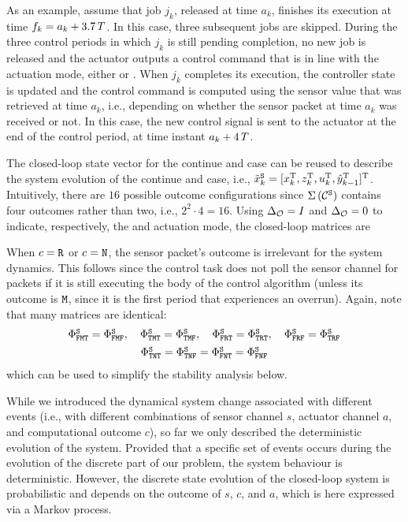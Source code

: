As an example, assume that job $j_k$, released at time $a_k$, finishes its execution at time $f_k = a_k + 3.7\,T$.
In this case, three subsequent jobs are skipped.
During the three control periods in which $j_k$ is still pending completion, no new job is released and the actuator outputs a control command that is in line with the actuation mode, either \tH{} or \tZ{}.
When $j_k$ completes its execution, the controller state is updated and the control command is computed using the sensor value that was retrieved at time $a_k$, i.e., depending on whether the sensor packet at time $a_k$ was received or not.
In this case, the new control signal is sent to the actuator at the end of the control period, at time instant $a_k+4\,T$.

The closed-loop state vector for the continue and \tK{} case can be reused to describe the system evolution of the continue and \tS{} case, i.e., $\tilde x_k^{\texttt{S}} = [ x_k^{\mathrm{\small{T}}}{}, z_k^{\mathrm{\small{T}}}{}, u_k^{\mathrm{\small{T}}}{}, \hat y_{k-1}^{\mathrm{\small{T}}}{} ]^{\mathrm{\small{T}}}{}$.
Intuitively, there are $16$ possible outcome configurations since $\Sigma\,({\mathcal{C}^{\texttt{S}}}){}$ contains four outcomes rather than two, i.e., $2^2\cdot 4=16$.
Using $\Delta_{\mathcal{O}} = I$ and $\Delta_{\mathcal{O}} = 0$ to indicate, respectively, the \tH{} and \tZ{} actuation mode, the closed-loop matrices are
{\small
%
}

When $c=\texttt{R}$ or $c=\texttt{N}$, the sensor packet's outcome is irrelevant for the system dynamics.
This follows since the control task does not poll the sensor channel for packets if it is still executing the body of the control algorithm (unless its outcome is $\texttt{M}$, since it is the first period that experiences an overrun).
Again, note that many matrices are identical:
\begin{equation*}
\begin{matrix}
    \Phi^{\texttt{S}}_{\texttt{F}\texttt{M}\texttt{T}} = \Phi^{\texttt{S}}_{\texttt{F}\texttt{M}\texttt{F}},\quad \Phi^{\texttt{S}}_{\texttt{T}\texttt{M}\texttt{T}} = \Phi^{\texttt{S}}_{\texttt{T}\texttt{M}\texttt{F}}, \quad \Phi^{\texttt{S}}_{\texttt{F}\texttt{R}\texttt{T}} = \Phi^{\texttt{S}}_{\texttt{T}\texttt{R}\texttt{T}},\quad \Phi^{\texttt{S}}_{\texttt{F}\texttt{R}\texttt{F}} = \Phi^{\texttt{S}}_{\texttt{T}\texttt{R}\texttt{F}} \\[1ex]
    \Phi^{\texttt{S}}_{\texttt{T}\texttt{N}\texttt{T}} = \Phi^{\texttt{S}}_{\texttt{T}\texttt{N}\texttt{F}} = \Phi^{\texttt{S}}_{\texttt{F}\texttt{N}\texttt{T}} = \Phi^{\texttt{S}}_{\texttt{F}\texttt{N}\texttt{F}} \\
    \end{matrix}
\end{equation*}
which can be used to simplify the stability analysis below.

While we introduced the dynamical system change associated with different events (i.e., with different combinations of sensor channel $s$, actuator channel $a$, and computational outcome $c$), so far we only described the deterministic evolution of the system.
Provided that a specific set of events occurs during the evolution of the discrete part of our problem, the system behaviour is deterministic.
However, the discrete state evolution of the closed-loop system is probabilistic and depends on the outcome of $s$, $c$, and $a$, which is here expressed via a Markov process.

